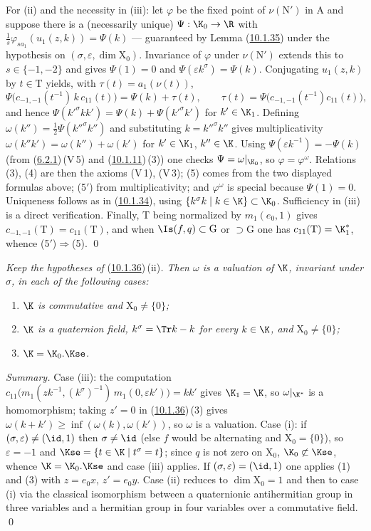 \documentclass[12pt,a4paper,oneside,english]{smfart}
\makeatletter
\newcommand{\btanchor}[1]{\leavevmode\Hy@raisedlink{\hypertarget{bt:#1}{}}}
\newcommand{\btref}[1]{\hyperlink{bt:#1}{#1}}
\theoremstyle{definition}
\theoremstyle{bt}
\makeatother
\begin{document}
For (ii) and the necessity in (iii): let $\varphi$ be the fixed point of
$\nu(\mathrm{N}')$ in $\mathrm{A}$ and suppose there is a (necessarily unique)
$\Psi:\K_0\to\R$ with $\frac1s\varphi_{sa_1}(u_1(z,k))=\Psi(k)$ --- guaranteed by
Lemma (\btref{10.1.35}) under the hypothesis on
$(\sigma,\varepsilon,\dim\mathrm{X}_0)$. Invariance of $\varphi$ under
$\nu(\mathrm{N}')$ extends this to $s\in\{-1,-2\}$ and gives $\Psi(1)=0$ and
$\Psi(\varepsilon k^{\sigma})=\Psi(k)$. Conjugating $u_1(z,k)$ by $t\in\mathrm{T}$
yields, with $\tau(t)=a_1(\nu(t))$,
\[
\Psi\bigl(c_{-1,-1}(t^{-1})\,k\,c_{11}(t)\bigr)=\Psi(k)+\tau(t),
\qquad
\tau(t)=\Psi\bigl(c_{-1,-1}(t^{-1})c_{11}(t)\bigr),
\]
and hence $\Psi(k'^{\sigma}kk')=\Psi(k)+\Psi(k'^{\sigma}k')$ for $k'\in\K_1$.
Defining $\omega(k'')=\frac12\Psi(k''^{\sigma}k'')$ and substituting
$k=k''^{\sigma}k''$ gives multiplicativity $\omega(k''k')=\omega(k'')+\omega(k')$
for $k'\in\K_1$, $k''\in\K$. Using $\Psi(\varepsilon k^{-1})=-\Psi(k)$ (from
(\btref{6.2.1})\,(V\,5) and (\btref{10.1.11})\,(3)) one checks $\Psi=\omega|_{\K_0}$, so
$\varphi=\varphi^{\omega}$. Relations (3), (4) are then the axioms (V\,1),
(V\,3); (5) comes from the two displayed formulas above; (5$'$) from
multiplicativity; and $\varphi^{\omega}$ is special because $\Psi(1)=0$.
Uniqueness follows as in (\btref{10.1.34}), using
$\{k^{\sigma}k\mid k\in\K\}\subset\K_0$. Sufficiency in (iii) is a direct
verification. Finally, $\mathrm{T}$ being normalized by $m_1(e_0,1)$ gives
$c_{-1,-1}(\mathrm{T})=c_{11}(\mathrm{T})$, and when
$\Is(f,q)\subset\mathrm{G}$ or $\supset\mathrm{G}$ one has
$c_{11}(\mathrm{T})=\K_1^{*}$, whence (5$'$)$\Rightarrow$(5). \qed

\btanchor{10.1.37}
\emph{Keep the hypotheses of} (\btref{10.1.36})\,(ii)\emph{. Then $\omega$ is a
valuation of $\K$, invariant under $\sigma$, in each of the following cases:}
\begin{enumerate}[label=(\roman*),leftmargin=2.5em]
\item \emph{$\K$ is commutative and $\mathrm{X}_0\neq\{0\}$;}
\item \emph{$\K$ is a quaternion field, $k^{\sigma}=\Tr k-k$ for every $k\in\K$,
and $\mathrm{X}_0\neq\{0\}$;}
\item \emph{$\K=\K_0.\Kse$.}
\end{enumerate}

\pf
\emph{Summary.} Case (iii): the computation
$c_{11}\bigl(m_1(zk^{-1},(k^{\sigma})^{-1})\,m_1(0,\varepsilon k')\bigr)=kk'$
gives $\K_1=\K$, so $\omega|_{\K^{*}}$ is a homomorphism; taking $z'=0$ in
(\btref{10.1.36})\,(3) gives $\omega(k+k')\geqslant\inf(\omega(k),\omega(k'))$, so
$\omega$ is a valuation. Case (i): if
$(\sigma,\varepsilon)\neq(\id,1)$ then $\sigma\neq\id$ (else $f$ would be
alternating and $\mathrm{X}_0=\{0\}$), so $\varepsilon=-1$ and
$\Kse=\{t\in\K\mid t^{\sigma}=t\}$; since $q$ is not zero on $\mathrm{X}_0$,
$\K_0\not\subset\Kse$, whence $\K=\K_0.\Kse$ and case (iii) applies. If
$(\sigma,\varepsilon)=(\id,1)$ one applies (1) and (3) with $z=e_0x$,
$z'=e_0y$. Case (ii) reduces to $\dim\mathrm{X}_0=1$ and then to case (i) via
the classical isomorphism between a quaternionic antihermitian group in three
variables and a hermitian group in four variables over a commutative field.
\qed
\end{document}
